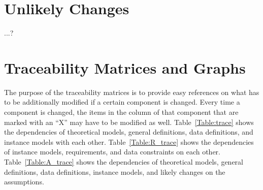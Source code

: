 \documentclass[12pt]{article}
\begin{document}
\section{Unlikely Changes}    

...?\\

\section{Traceability Matrices and Graphs}

The purpose of the traceability matrices is to provide easy references on what
has to be additionally modified if a certain component is changed.  Every time a
component is changed, the items in the column of that component that are marked
with an ``X'' may have to be modified as well.  Table~\ref{Table:trace} shows the
dependencies of theoretical models, general definitions, data definitions, and
instance models with each other. Table~\ref{Table:R_trace} shows the
dependencies of instance models, requirements, and data constraints on each
other. Table~\ref{Table:A_trace} shows the dependencies of theoretical models,
general definitions, data definitions, instance models, and likely changes on
the assumptions.



\end{document}
